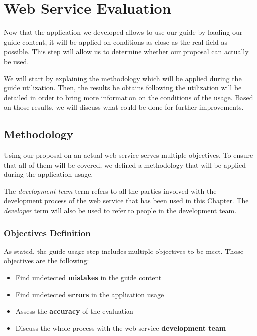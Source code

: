 \chapter{Web Service Evaluation}
\label{chap:use}

Now that the application we developed allows to use our guide by loading our guide content, it will be applied on conditions as close as the real field as possible. This step will allow us to determine whether our proposal can actually be used.

We will start by explaining the methodology which will be applied during the guide utilization. Then, the results be obtains following the utilization will be detailed in order to bring more information on the conditions of the usage. Based on those results, we will discuss what could be done for further improvements.

\minitoc

\newpage

\section{Methodology}
\label{sec:use_methodology}

Using our proposal on an actual web service serves multiple objectives. To ensure that all of them will be covered, we defined a methodology that will be applied during the application usage.

The \textit{development team} term refers to all the parties involved with the development process of the web service that has been used in this Chapter. The \textit{developer} term will also be used to refer to people in the development team.

\subsection{Objectives Definition}
\label{subsec:use_methodology_objective}

As stated, the guide usage step includes multiple objectives to be meet. Those objectives are the following:
\begin{itemize}
	\item Find undetected \textbf{mistakes} in the guide content
	\item Find undetected \textbf{errors} in the application usage
	\item Assess the \textbf{accuracy} of the evaluation
	\item Discuss the whole process with the web service \textbf{development team}
\end{itemize}


